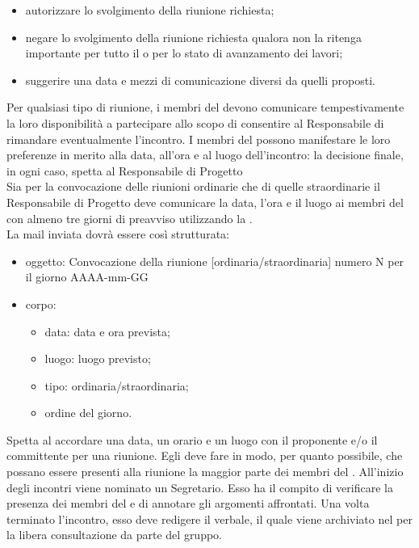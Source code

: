 					\begin{itemize}
						\item autorizzare lo svolgimento della riunione richiesta;
						\item negare lo svolgimento della riunione richiesta qualora non la ritenga importante per tutto il  o per lo stato di avanzamento dei lavori;
						\item suggerire una data e mezzi di comunicazione diversi da quelli proposti.
					\end{itemize}
					Per qualsiasi tipo di riunione, i membri del  devono comunicare tempestivamente la loro disponibilità a partecipare allo scopo di consentire al Responsabile di rimandare eventualmente l'incontro. I membri del  possono manifestare le loro preferenze in merito alla data, all'ora e al luogo dell'incontro: la decisione finale, in ogni caso, spetta al Responsabile di Progetto\\
					Sia per la convocazione delle riunioni ordinarie che di quelle straordinarie il Responsabile di Progetto deve comunicare la data, l'ora e il luogo ai membri del  con almeno tre giorni di preavviso utilizzando la .\\
					La mail inviata dovrà essere così strutturata:
					\begin{itemize}
						\item oggetto: Convocazione della riunione [ordinaria/straordinaria] numero N per il giorno AAAA-mm-GG
						\item corpo:
						\begin{itemize}
							\item data: data e ora prevista;
							\item luogo: luogo previsto;
							\item tipo: ordinaria/straordinaria;
							\item ordine del giorno.
						\end{itemize}
					\end{itemize}
					Spetta al  accordare una data, un orario e un luogo con il proponente e/o il committente per una riunione. Egli deve fare in modo, per quanto possibile, che possano essere presenti alla riunione la maggior parte dei membri del .
					All'inizio degli incontri viene nominato un Segretario. Esso ha il compito di verificare la presenza dei membri del  e di annotare gli argomenti affrontati. Una volta terminato l'incontro, esso deve redigere il verbale, il quale viene archiviato nel  per la libera consultazione da parte del gruppo.\\
